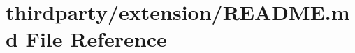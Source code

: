\hypertarget{thirdparty_2extension_2README_8md}{}\section{thirdparty/extension/\+R\+E\+A\+D\+ME.md File Reference}
\label{thirdparty_2extension_2README_8md}
